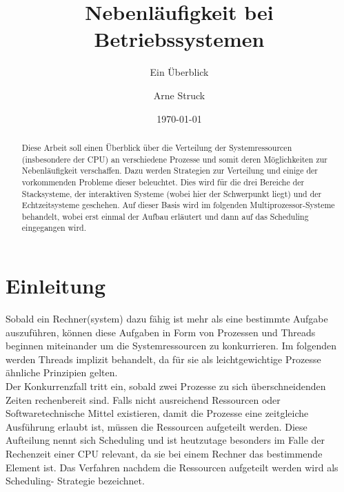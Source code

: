 \title{Nebenläufigkeit bei Betriebssystemen}
\subtitle{Ein Überblick}

\author{Arne Struck}

  
\date{\today}

\maketitle


\begin{abstract}
Diese Arbeit soll einen Überblick über die Verteilung der Systemressourcen (insbesondere der CPU) an 
verschiedene Prozesse und somit deren Möglichkeiten zur Nebenläufigkeit verschaffen. Dazu werden Strategien 
zur Verteilung und einige der vorkommenden Probleme dieser beleuchtet. Dies wird für die drei Bereiche der 
Stacksysteme, der interaktiven Systeme (wobei hier der Schwerpunkt liegt) und der Echtzeitsysteme 
geschehen. Auf dieser Basis wird im folgenden Multiprozessor-Systeme behandelt, wobei erst einmal der 
Aufbau erläutert und dann auf das Scheduling eingegangen wird. 
\end{abstract}

\tableofcontents
\newpage

\section{Einleitung}
Sobald ein Rechner(system) dazu fähig ist mehr als eine bestimmte Aufgabe auszuführen, können diese 
Aufgaben in Form von Prozessen und Threads beginnen miteinander um die Systemressourcen zu konkurrieren.
Im folgenden werden Threads implizit behandelt, da für sie als leichtgewichtige Prozesse ähnliche 
Prinzipien gelten. \\
Der Konkurrenzfall tritt ein, sobald zwei Prozesse zu sich überschneidenden Zeiten rechenbereit sind. Falls 
nicht ausreichend Ressourcen oder Softwaretechnische Mittel existieren, damit die Prozesse eine zeitgleiche 
Ausführung erlaubt ist, müssen die Ressourcen aufgeteilt werden. Diese Aufteilung nennt sich Scheduling und 
ist heutzutage besonders im Falle der Rechenzeit einer CPU relevant, da sie bei einem Rechner das 
bestimmende Element ist. Das Verfahren nachdem die Ressourcen aufgeteilt werden wird als Scheduling-
Strategie bezeichnet. \\

